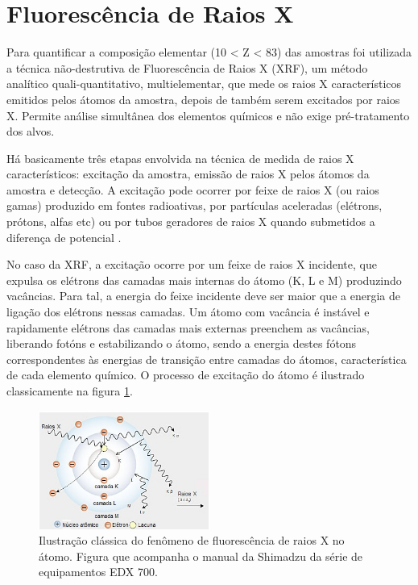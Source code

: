 \newpage
\section{Fluorescência de Raios X}

Para quantificar a composição elementar (10 < Z < 83) das 
amostras foi utilizada a técnica não-destrutiva de Fluorescência de Raios X 
(XRF), um método analítico quali-quantitativo, multielementar, 
que mede os raios X característicos emitidos pelos átomos da amostra, 
depois de também serem excitados por raios X. Permite análise simultânea dos 
elementos químicos e não exige pré-tratamento dos alvos.

Há basicamente três etapas envolvida na técnica de medida de raios X 
característicos: excitação da amostra, emissão de raios X pelos átomos da amostra
e detecção. A excitação pode ocorrer por feixe de raios X (ou raios gamas) 
produzido em fontes radioativas, por partículas aceleradas 
(elétrons, prótons, alfas etc) ou 
por tubos geradores de raios X quando submetidos a diferença de potencial
\citep{jenkins1988}.

No caso da XRF, a excitação ocorre por um feixe de raios X incidente, que  
expulsa os elétrons das camadas mais internas do átomo (K, L e M) 
produzindo vacâncias. Para tal, a energia do feixe incidente deve ser maior 
que a energia de ligação dos elétrons nessas camadas. Um átomo com vacância é 
instável e rapidamente elétrons das camadas mais externas preenchem as vacâncias,
liberando fotóns e estabilizando o átomo, sendo a energia destes fótons 
correspondentes às energias de transição entre camadas do átomos, 
característica de cada elemento químico. O processo de excitação do átomo 
é ilustrado classicamente na figura \ref{fig:shimadzu_atomo}.

\begin{figure}[H]
  \centering
  \includegraphics[width=0.5\textwidth]{../inputs/images/shimadzu_atomo.jpg}
  \caption{Ilustração clássica do fenômeno de fluorescência de raios X no átomo. 
           Figura que acompanha o manual da Shimadzu da série de equipamentos
           EDX 700. \label{fig:shimadzu_atomo}}
\end{figure}

